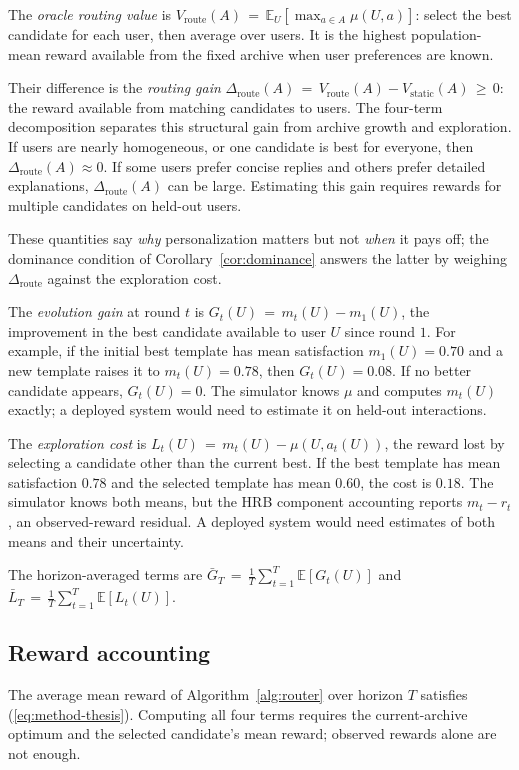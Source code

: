 \documentclass{article} %
\providecommand{\E}{\mathbb{E}}
\renewcommand{\eqref}[1]{\textup{(\ref{#1})}}
\begin{document}
The \emph{oracle routing value} is $V_{\mathrm{route}}(A) \,=\, \E_{U}[\max_{a \in A} \mu(U,a)]$: select the best candidate for each user, then average over users. It is the highest population-mean reward available from the fixed archive when user preferences are known.

Their difference is the \emph{routing gain} $\Delta_{\mathrm{route}}(A) \,=\, V_{\mathrm{route}}(A) - V_{\mathrm{static}}(A) \,\geq\, 0$: the reward available from matching candidates to users. The four-term decomposition separates this structural gain from archive growth and exploration. If users are nearly homogeneous, or one candidate is best for everyone, then $\Delta_{\mathrm{route}}(A) \approx 0$. If some users prefer concise replies and others prefer detailed explanations, $\Delta_{\mathrm{route}}(A)$ can be large. Estimating this gain requires rewards for multiple candidates on held-out users.

These quantities say \emph{why} personalization matters but not \emph{when} it pays off; the dominance condition of Corollary~\ref{cor:dominance} answers the latter by weighing $\Delta_{\mathrm{route}}$ against the exploration cost.

The \emph{evolution gain} at round $t$ is $G_t(U) \,=\, m_t(U) - m_1(U)$, the improvement in the best candidate available to user $U$ since round $1$. For example, if the initial best template has mean satisfaction $m_1(U) = 0.70$ and a new template raises it to $m_t(U) = 0.78$, then $G_t(U) = 0.08$. If no better candidate appears, $G_t(U) = 0$. The simulator knows $\mu$ and computes $m_t(U)$ exactly; a deployed system would need to estimate it on held-out interactions.

The \emph{exploration cost} is $L_t(U) \,=\, m_t(U) - \mu(U, a_t(U))$, the reward lost by selecting a candidate other than the current best. If the best template has mean satisfaction $0.78$ and the selected template has mean $0.60$, the cost is $0.18$. The simulator knows both means, but the HRB component accounting reports \(m_t-r_t\), an observed-reward residual. A deployed system would need estimates of both means and their uncertainty.


The horizon-averaged terms are $\bar G_T \,=\, \frac{1}{T}\sum_{t=1}^T \E[G_t(U)]$ and $\bar L_T \,=\, \frac{1}{T}\sum_{t=1}^T \E[L_t(U)]$.

\subsection{Reward accounting}
The average mean reward of Algorithm~\ref{alg:router} over horizon $T$
satisfies \eqref{eq:method-thesis}. Computing all four terms requires the current-archive optimum and the
selected candidate's mean reward; observed rewards alone are not enough.
\end{document}
